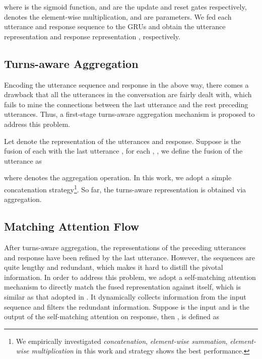 \documentclass[11pt]{article}
\begin{document}
where  is the sigmoid function,  and  are the update and reset gates respectively,  denotes the element-wise multiplication, and  are parameters. We fed each utterance and response sequence to the GRUs and obtain the utterance representation  and response representation , respectively.

\subsection{Turns-aware Aggregation}
\iffalse
\begin{figure}
	\centering
	\subfigure[concat]{
		\label{fig:subfig:a} \texttt{[image: concat.pdf]}}
	\subfigure[summation]{
		\label{fig:subfig:b} \texttt{[image: sum.pdf]}}
	\subfigure[multiplication]{
		\label{fig:subfig:c} \texttt{[image: sum.pdf]}}
	\caption{Character-augmented word embedding strategies.}
	
	\label{fig:merge} \end{figure}
\fi
Encoding the utterance sequence and response in the above way, there comes a drawback that all the utterances in the conversation are fairly dealt with, which fails to mine the connections between the last utterance and the rest preceding utterances. Thus, a first-stage turns-aware aggregation mechanism is proposed to address this problem.

Let  denote the representation of the utterances and response. Suppose  is the fusion of each  with the last utterance , for each ,  , we define the fusion of the utterance as

where  denotes the aggregation operation. In this work, we adopt a simple concatenation strategy\footnote{We empirically investigated \emph{concatenation}, \emph{element-wise summation}, \emph{element-wise multiplication} in this work and  strategy shows the best performance.}. So far, the turns-aware representation  is obtained via aggregation. 
\subsection{Matching Attention Flow}
After turns-aware aggregation, the representations of the preceding utterances and response have been refined by the last utterance. However, the sequences are quite lengthy and redundant, which makes it hard to distill the pivotal information. In order to address this problem, we adopt a self-matching attention mechanism to directly match the fused representation against itself, which is similar as that adopted in  \cite{Wang2017Gated}. It dynamically collects information from the input sequence and filters the redundant information. 
Suppose   is the input and  is the output of the self-matching attention on response, then ,  is defined as
\end{document}
